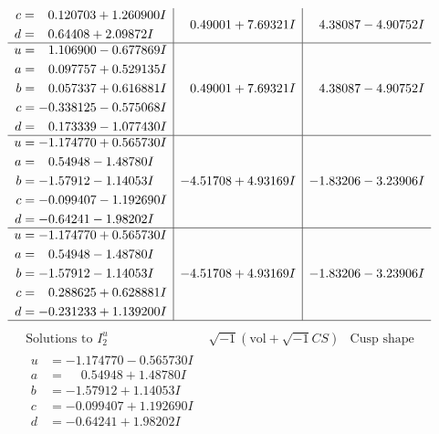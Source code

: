 \documentclass[1p]{elsarticle_modified}
\theoremstyle{definition}
\newcommand{\I}{\sqrt{-1}}
\begin{document}
$$\begin{array}{c|c|c}
\begin{aligned}
c &= \phantom{-}0.120703 + 1.260900 I \\
d &= \phantom{-}0.64408 + 2.09872 I\end{aligned}
 & \phantom{-}0.49001 + 7.69321 I & \phantom{-}4.38087 - 4.90752 I \\ \hline\begin{aligned}
u &= \phantom{-}1.106900 - 0.677869 I \\
a &= \phantom{-}0.097757 + 0.529135 I \\
b &= \phantom{-}0.057337 + 0.616881 I \\
c &= -0.338125 - 0.575068 I \\
d &= \phantom{-}0.173339 - 1.077430 I\end{aligned}
 & \phantom{-}0.49001 + 7.69321 I & \phantom{-}4.38087 - 4.90752 I \\ \hline\begin{aligned}
u &= -1.174770 + 0.565730 I \\
a &= \phantom{-}0.54948 - 1.48780 I \\
b &= -1.57912 - 1.14053 I \\
c &= -0.099407 - 1.192690 I \\
d &= -0.64241 - 1.98202 I\end{aligned}
 & -4.51708 + 4.93169 I & -1.83206 - 3.23906 I \\ \hline\begin{aligned}
u &= -1.174770 + 0.565730 I \\
a &= \phantom{-}0.54948 - 1.48780 I \\
b &= -1.57912 - 1.14053 I \\
c &= \phantom{-}0.288625 + 0.628881 I \\
d &= -0.231233 + 1.139200 I\end{aligned}
 & -4.51708 + 4.93169 I & -1.83206 - 3.23906 I\\
 \hline 
 \end{array}$$\newpage$$\begin{array}{c|c|c}  
\text{Solutions to }I^u_{2}& \I (\text{vol} + \sqrt{-1}CS) & \text{Cusp shape}\\
 \hline 
\begin{aligned}
u &= -1.174770 - 0.565730 I \\
a &= \phantom{-}0.54948 + 1.48780 I \\
b &= -1.57912 + 1.14053 I \\
c &= -0.099407 + 1.192690 I \\
d &= -0.64241 + 1.98202 I\end{aligned}

\end{array}$$
\end{document}
